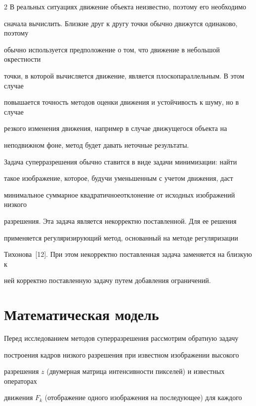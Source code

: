 \begin{multicols}{2}
     В реальных ситуациях движение объекта неизвестно, поэтому его необходимо


сначала вы\-чис\-лить. Близкие друг к другу точки обычно движутся одинаково, поэтому


обычно используется предположение о том, что движение в небольшой окрестности


точки, в которой вычисляется движение, является плоскопараллельным. В этом случае


повышается точность методов оценки движения и устойчивость к шуму, но в случае


резкого изменения движения, например в случае движущегося объекта на


неподвижном фоне, метод будет давать неточные результаты.





     Задача суперразрешения обычно ставится в виде задачи минимизации: найти


такое изображение, которое, будучи уменьшенным с учетом движения, даст


минимальное суммарное квадратичное\linebreak отклонение от исходных изображений низкого\linebreak


разрешения. Эта задача является некорректно поставленной. Для ее решения


применяется ре\-гу\-ля\-ри\-зи\-ру\-ющий метод, основанный на методе регуляризации


Тихонова~[12]. При этом некорректно поставленная задача заменяется на близкую к


ней корректно поставленную задачу путем добавления ограничений.





     \section{Математическая модель}





     Перед исследованием методов суперразрешения рассмотрим обратную задачу


построения кад\-ров низкого разрешения при известном изображении высокого


разрешения $z$ (двумерная матрица интенсивности пикселей) и известных операторах


движения $F_k$ (отображение одного изображения на последующее) для каждого



\end{multicols}
